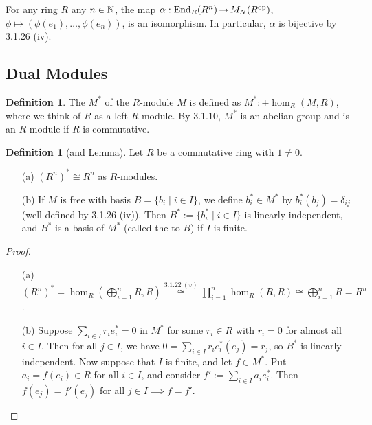 \documentclass[11pt]{book}
\theoremstyle{definition}   \newtheorem{defn}[counter]{Definition} %
\DeclareMathOperator{\ra}{\rightarrow}   \DeclareMathOperator{\Poly}{\mathbf{P}}   \DeclareMathOperator{\spn}{\textnormal{span}}   \DeclareMathOperator{\aut}{\textnormal{Aut}}
\newcommand{\vs}{\vspace{8pt}}
\numberwithin{counter}{chapter}
\begin{document}
\begin{example}
For any ring $R$ any $n \in \operatorname{\mathbb{N}}$, the map $\alpha : \tn{End}_R(R^n) \ra M_N(R\op)$, $\phi \mapsto (\phi(e_1),\dots,\phi(e_n))$, is an isomorphism. In particular, $\alpha$ is bijective by 3.1.26 (iv).
\end{example}

\vs

\subsection*{Dual Modules}

\vs

\begin{defn}
The  $M^*$ of the $R$-module $M$ is defined as $M^* :+ \hom_R(M,R)$, where we think of $R$ as a left $R$-module. By 3.1.10, $M^*$ is an abelian group and is an $R$-module if $R$ is commutative.
\end{defn}

\vs

\begin{defn}[and Lemma]
Let $R$ be a commutative ring with $1 \ne 0$.
\begin{enumerate}
\item[(a)] $(R^n)^* \cong R^n$ as $R$-modules.
\item[(b)] If $M$ is free with basis $B = \{b_i \mid i \in I\}$, we define $b_i^* \in M^*$ by $b_i^*(b_j) = \delta_{ij}$ (well-defined by 3.1.26 (iv)). Then $B^* := \{b_i^* \mid i \in I\}$ is linearly independent, and $B^*$ is a basis of $M^*$ (called the  to $B$) if $I$ is finite.
\end{enumerate}
\end{defn}

\begin{proof}
\begin{enumerate}\
\item[(a)] $(R^n)^* = \hom_R\left(\bigoplus_{i=1}^n R, R\right) \overset{3.1.22 \ (v)}{\cong} \prod_{i=1}^n \hom_R(R,R) \cong \bigoplus_{i=1}^n R = R^n$.

\item[(b)] Suppose $\sum_{i \in I} r_i e_{i}^* = 0$ in $M^*$ for some $r_i \in R$ with $r_i = 0$ for almost all $i \in I$. Then for all $j \in I$, we have $0 = \sum_{i \in I} r_i e_i^*(e_j) = r_j$, so $B^*$ is linearly independent. Now suppose that $I$ is finite, and let $f \in M^*$. Put $a_i = f(e_i) \in R$ for all $i \in I$, and consider $f':= \sum_{i \in I} a_i e_i^*$. Then $f(e_j) = f'(e_j)$ for all $j \in I \implies f = f'$.
\end{enumerate}
\end{proof}
\end{document}
